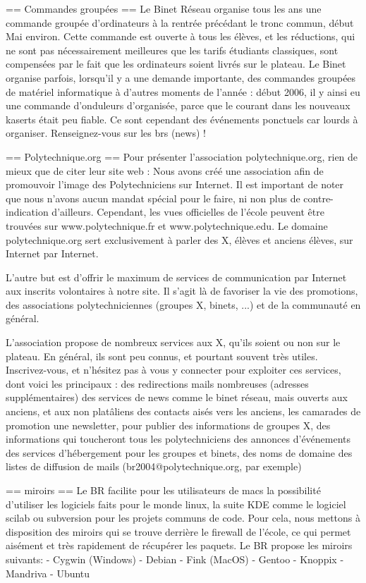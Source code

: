 == Commandes groupées ==
Le Binet Réseau organise tous les ans une commande groupée d'ordinateurs à la rentrée
précédant le tronc commun, début Mai environ. Cette commande est ouverte à tous les élèves,
et les réductions, qui ne sont pas nécessairement meilleures que les tarifs étudiants
classiques, sont compensées par le fait que les ordinateurs soient livrés sur le plateau.
Le Binet organise parfois, lorsqu'il y a une demande importante, des commandes groupées
de matériel informatique à d'autres moments de l'année : début 2006, il y ainsi eu une
commande d'onduleurs d'organisée, parce que le courant dans les nouveaux kaserts était
peu fiable. Ce sont cependant des événements ponctuels car lourds à organiser.
Renseignez-vous sur les brs (news) !

== Polytechnique.org ==
Pour présenter l'association polytechnique.org, rien de mieux que de citer leur site web :
  Nous avons créé une association afin de promouvoir l'image des Polytechniciens sur Internet.
  Il est important de noter que nous n'avons aucun mandat spécial pour le faire, ni non plus
  de contre-indication d'ailleurs. Cependant, les vues officielles de l'école peuvent être
  trouvées sur www.polytechnique.fr et www.polytechnique.edu. Le domaine polytechnique.org sert
  exclusivement à parler des X, élèves et anciens élèves, sur Internet par Internet.

  L'autre but est d'offrir le maximum de services de communication par Internet aux inscrits
  volontaires à notre site. Il s'agit là de favoriser la vie des promotions, des associations
  polytechniciennes (groupes X, binets, ...) et de la communauté en général.

L'association propose de nombreux services aux X, qu'ils soient ou non sur le plateau.
En général, ils sont peu connus, et pourtant souvent très utiles. Inscrivez-vous, et n'hésitez
pas à vous y connecter pour exploiter ces services, dont voici les principaux :
  des redirections mails nombreuses (adresses supplémentaires)
  des services de news comme le binet réseau, mais ouverts aux anciens, et aux non platâliens
  des contacts aisés vers les anciens, les camarades de promotion
  une newsletter, pour publier des informations de groupes X, des informations qui toucheront tous les polytechniciens
  des annonces d'événements
  des services d'hébergement pour les groupes et binets, des noms de domaine
  des listes de diffusion de mails (br2004@polytechnique.org, par exemple)

== miroirs == 
Le BR facilite pour les utilisateurs de macs la possibilité d'utiliser les logiciels faits pour le monde linux, la suite KDE comme le logiciel scilab ou subversion pour les projets communs de code. Pour cela, nous mettons à disposition des miroirs qui se trouve derrière le firewall de l'école, ce qui permet aisément et très rapidement de récupérer les paquets. Le BR propose les miroirs suivants:
	- Cygwin (Windows)
	- Debian
	- Fink (MacOS)
	- Gentoo
	- Knoppix
	- Mandriva
	- Ubuntu
	
